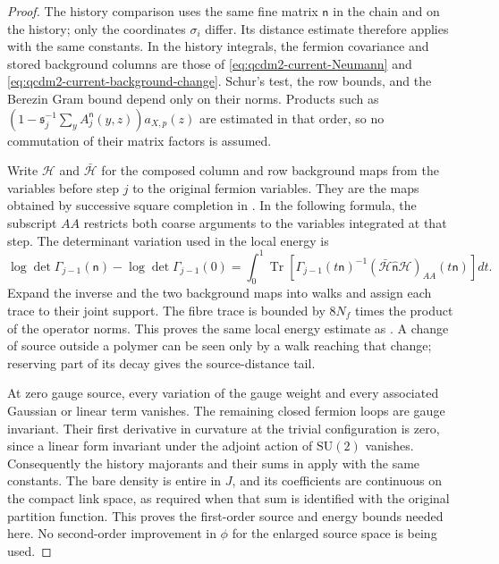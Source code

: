 \documentclass[11pt,letterpaper,reqno]{amsart}
\theoremstyle{definition}
\theoremstyle{remark}
\begin{document}
\begin{proof}
The history comparison uses the same fine matrix
$\mathsf n$ in the chain and on the history; only the
coordinates $\sigma_i$ differ. Its distance estimate
therefore applies with the same constants. In the
history integrals, the fermion covariance and stored
background columns are those of
\eqref{eq:qcdm2-current-Neumann} and
\eqref{eq:qcdm2-current-background-change}. Schur's
test, the row bounds, and the Berezin Gram bound depend
only on their norms. Products such as
$(1-\mathfrak s_j^{-1}\sum_yA_j^{\mathsf n}(y,z))a_{X,p}(z)$
are estimated in that order, so no commutation of
their matrix factors is assumed.

Write $\mathcal H$ and $\bar{\mathcal H}$ for the composed
column and row background maps from the variables before
step $j$ to the original fermion variables. They are the
maps obtained by successive square completion in
\cite[Section 5.3]{QCDM1}. In the following formula,
the subscript $AA$ restricts both coarse arguments to the
variables integrated at that step. The determinant
variation used in the local energy is
\[
 \log\det\Gamma_{j-1}(\mathsf n)
       -\log\det\Gamma_{j-1}(0)
 =\int_0^1\operatorname{Tr}\left[
  \Gamma_{j-1}(t\mathsf n)^{-1}
  (\bar{\mathcal H}\hat{\mathsf n}\mathcal H)_{AA}
                         (t\mathsf n)\right]dt.
\]
Expand the inverse and the two background maps into
walks and assign each trace to their joint support.
The fibre trace is bounded by $8N_f$ times the product
of the operator norms. This proves the same local
energy estimate as \cite[Prop. 10.6]{QCDM1}.
A change of source outside a polymer can be seen only
by a walk reaching that change; reserving part of its
decay gives the source-distance tail.

At zero gauge source, every variation of the gauge
weight and every associated Gaussian or linear term
vanishes. The remaining closed fermion loops are
gauge invariant. Their first derivative in curvature
at the trivial configuration is zero, since a linear
form invariant under the adjoint action of
$\mathrm{SU}(2)$ vanishes. Consequently the history
majorants and their sums in
\cite[Prop. 10.14]{QCDM1} apply with the same
constants. The bare density is entire in $J$, and
its coefficients are continuous on the compact link
space, as required when that sum is identified with
the original partition function. This proves the
first-order source and energy bounds needed here.
No second-order improvement in $\phi$ for the enlarged
source space is being used.


\end{proof}
\end{document}
